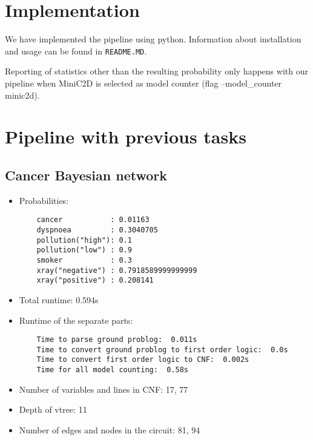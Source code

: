\section{Implementation}
We have implemented the pipeline using python. Information about installation and usage can be found in \texttt{README.MD}.

Reporting of statistics other than the resulting probability only happens with our pipeline when MiniC2D is selected as model counter (flag --model\_counter minic2d).

\section{Pipeline with previous tasks}
\subsection{Cancer Bayesian network}
\begin{itemize}
    \item Probabilities:
    \begin{lstlisting}
    cancer           : 0.01163
    dyspnoea         : 0.3040705
    pollution("high"): 0.1
    pollution("low") : 0.9
    smoker           : 0.3
    xray("negative") : 0.7918589999999999
    xray("positive") : 0.208141
    \end{lstlisting}
    \item Total runtime: 0.594s
    \item Runtime of the separate parts:
    \begin{lstlisting}
    Time to parse ground problog:  0.011s
    Time to convert ground problog to first order logic:  0.0s
    Time to convert first order logic to CNF:  0.002s
    Time for all model counting:  0.58s
    \end{lstlisting}
    \item Number of variables and lines in CNF: 17, 77
    \item Depth of vtree: 11
    \item Number of edges and nodes in the circuit: 81, 94
\end{itemize}
